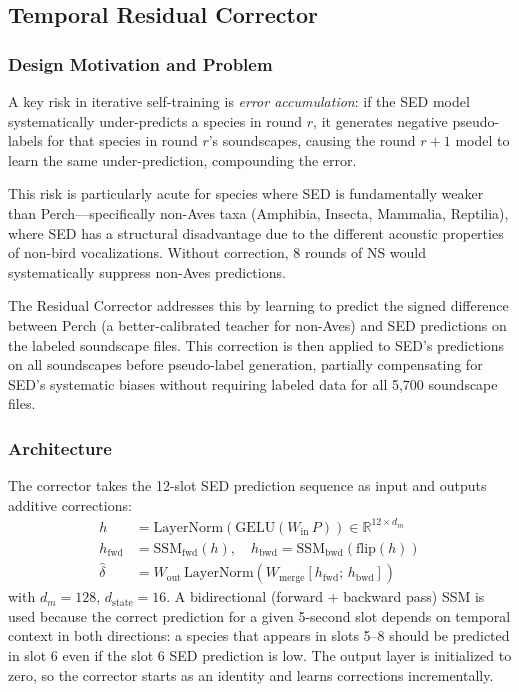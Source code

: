 \documentclass[journal]{IEEEtran}
\begin{document}
\subsection{Temporal Residual Corrector}

\subsubsection{Design Motivation and Problem}

A key risk in iterative self-training is \emph{error accumulation}: if the SED model systematically under-predicts a species in round $r$, it generates negative pseudo-labels for that species in round $r$'s soundscapes, causing the round $r+1$ model to learn the same under-prediction, compounding the error.

This risk is particularly acute for species where SED is fundamentally weaker than Perch---specifically non-Aves taxa (Amphibia, Insecta, Mammalia, Reptilia), where SED has a structural disadvantage due to the different acoustic properties of non-bird vocalizations.
Without correction, 8 rounds of NS would systematically suppress non-Aves predictions.

The Residual Corrector addresses this by learning to predict the signed difference between Perch (a better-calibrated teacher for non-Aves) and SED predictions on the labeled soundscape files.
This correction is then applied to SED's predictions on all soundscapes before pseudo-label generation, partially compensating for SED's systematic biases without requiring labeled data for all 5,700 soundscape files.

\subsubsection{Architecture}

The corrector takes the 12-slot SED prediction sequence as input and outputs additive corrections:
\begin{align}
  h &= \mathrm{LayerNorm}(\mathrm{GELU}(W_\text{in}\, P)) \in \mathbb{R}^{12 \times d_m} \\
  h_\text{fwd} &= \mathrm{SSM}_\text{fwd}(h),\quad h_\text{bwd} = \mathrm{SSM}_\text{bwd}(\mathrm{flip}(h)) \\
  \hat{\delta} &= W_\text{out}\,\mathrm{LayerNorm}(W_\text{merge}[h_\text{fwd};\,h_\text{bwd}])
\end{align}
with $d_m=128$, $d_\text{state}=16$.
A bidirectional (forward + backward pass) SSM is used because the correct prediction for a given 5-second slot depends on temporal context in both directions: a species that appears in slots 5--8 should be predicted in slot 6 even if the slot 6 SED prediction is low.
The output layer is initialized to zero, so the corrector starts as an identity and learns corrections incrementally.
\end{document}
